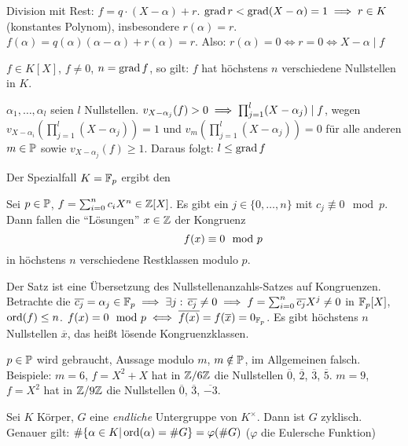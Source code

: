 \documentclass[a4paper,twoside,DIV15,BCOR12mm]{scrbook}
\begin{document}
\begin{beweis}
Division mit Rest: $f= q\cdot (X-\alpha) + r$. $\mathop{\mathrm{grad}}\nolimits r < \mathop{\mathrm{grad}}\nolimits
(X-\alpha) = 1 \implies r\in K$ (konstantes Polynom), insbesondere
$r(\alpha) = r$. $f(\alpha) = q(\alpha)(\alpha-\alpha) + r(\alpha) =
r $. Also: $r(\alpha) = 0 \iff {r = 0} \iff {X-\alpha \mid f}$
\end{beweis}

\begin{satz}
$f\in K[X]$, $f\ne 0$, $n=\mathop{\mathrm{grad}}\nolimits f$, so gilt: $f$ hat höchstens $n$
verschiedene Nullstellen in $K$.
\end{satz}

\begin{beweis}
$\alpha_1,\ldots,\alpha_l$ seien $l$ Nullstellen. $v_{X-\alpha_j}(f)
> 0  \implies \prod_{j=1}^l (X-\alpha_j) \mid f$, wegen
${v_{X-\alpha_i}(\prod_{j=1}^l(X-\alpha_j)) = 1}$ und
${v_{m}(\prod_{j=1}^l(X-\alpha_j)) = 0}$ für alle anderen $m\in
\mathbb{P}$ sowie $v_{X-\alpha_j}(f) \ge 1$. Daraus folgt: $l\le \mathop{\mathrm{grad}}\nolimits f$
\end{beweis}

Der Spezialfall $K=\mathbb{F}_p$ ergibt den

\begin{satz}
Sei $p\in\mathbb{P}$, $f=\sum_{i=0}^n c_iX^n \in \mathbb{Z}[X]$. Es gibt ein
$j\in\{0,\ldots,n\}$ mit $c_j\not\equiv 0 \mod p$. Dann fallen die
"`Lösungen"' $x\in\mathbb{Z}$ der Kongruenz
\[ f(x) \equiv 0\mathrlap{ \mod p} \]
in höchstens $n$ verschiedene Restklassen modulo $p$.
\end{satz}

\begin{beweis}
Der Satz ist eine Übersetzung des Nullstellenanzahls-Satzes auf
Kongruenzen. Betrachte die $\overline {c_j} = \alpha _j \in \mathbb{F}_p
\implies \exists j:\, \overline{c_j}\ne 0\implies f=\sum_{i=0}^n
\overline{c_j}X^j \ne 0$ in $\mathbb{F}_p[X]$, $\mathop{\rm ord}\nolimits(f)\le n$. $f(x) = 0
\mod p \iff \overline{f(x)} = f(\overline x) = 0_{\mathbb{F}_p}$. Es gibt
höchstens $n$ Nullstellen $\overline x$, das heißt lösende
Kongruenzklassen.
\end{beweis}

$p\in\mathbb{P}$ wird gebraucht, Aussage modulo $m$, $m\notin \mathbb{P}$, im
Allgemeinen falsch. Beispiele: $m=6$, $f=X^2+X$ hat in $\mathbb{Z}/6\mathbb{Z}$
die Nullstellen $\overline 0$, $\overline 2$, $\overline 3$,
$\overline 5$. $m=9$, $f=X^2$ hat in $\mathbb{Z}/9\mathbb{Z}$ die Nullstellen
$\overline 0$, $\overline 3$, $\overline {-3}$.

\begin{satz}[Primitivwurzelsatz]
Sei $K$ Körper, $G$ eine \emph{endliche} Untergruppe von $K^\times$.
Dann ist $G$ zyklisch. Genauer gilt: $\#\{\alpha \in K| \mathop{\rm ord}\nolimits(\alpha)
= \#G \} = \varphi(\#G)$ ($\varphi$ die Eulersche Funktion)
\end{satz}
\end{document}
